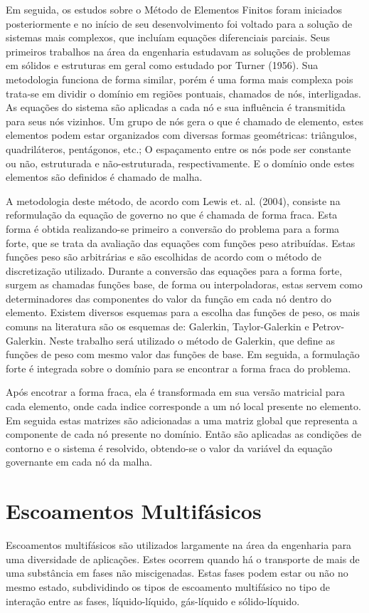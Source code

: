 Em seguida, os estudos sobre o Método de Elementos Finitos foram iniciados posteriormente e no início de seu desenvolvimento foi voltado para a solução de sistemas mais complexos, que incluíam equações diferenciais parciais.
Seus primeiros trabalhos na área da engenharia estudavam as soluções de problemas em sólidos e estruturas em geral como estudado por Turner (1956)\cite{Turner-1956}.
Sua metodologia funciona de forma similar, porém é uma forma mais complexa pois trata-se em dividir o domínio em regiões pontuais, chamados de nós, interligadas.
As equações do sistema são aplicadas a cada nó e sua influência é transmitida para seus nós vizinhos.
Um grupo de nós gera o que é chamado de elemento, estes elementos podem estar organizados com diversas formas geométricas: triângulos, quadriláteros, pentágonos, etc.;
O espaçamento entre os nós pode ser constante ou não, estruturada e não-estruturada, respectivamente.
E o domínio onde estes elementos são definidos é chamado de malha.

A metodologia deste método, de acordo com Lewis et. al. (2004)\cite{lewis}, consiste na reformulação da equação de governo no que é chamada de forma fraca.
Esta forma é obtida realizando-se primeiro a conversão do problema para a forma forte, que se trata da avaliação das equações com funções peso atribuídas.
Estas funções peso são arbitrárias e são escolhidas de acordo com o método de discretização utilizado.
Durante a conversão das equações para a forma forte, surgem as chamadas funções base, de forma ou interpoladoras, estas servem como determinadores das componentes do valor da função em cada nó dentro do elemento.
Existem diversos esquemas para a escolha das funções de peso, os mais comuns na literatura são os esquemas de: Galerkin, Taylor-Galerkin e Petrov-Galerkin.
Neste trabalho será utilizado o método de Galerkin, que define as funções de peso com mesmo valor das funções de base.
Em seguida, a formulação forte é integrada sobre o domínio para se encontrar a forma fraca do problema.

Após encotrar a forma fraca, ela é transformada em sua versão matricial para cada elemento, onde cada indice corresponde a um nó local presente no elemento.
Em seguida estas matrizes são adicionadas a uma matriz global que representa a componente de cada nó presente no domínio.
Então são aplicadas as condições de contorno e o sistema é resolvido, obtendo-se o valor da variável da equação governante em cada nó da malha.


\section{\textbf{Escoamentos Multifásicos}}
\label{sec_rev_MF}
Escoamentos multifásicos são utilizados largamente na área da engenharia para uma diversidade de aplicações.
Estes ocorrem quando há o transporte de mais de uma substância em fases não miscigenadas.
Estas fases podem estar ou não no mesmo estado, subdividindo os tipos de escoamento multifásico no tipo de interação entre as fases, líquido-líquido, gás-líquido e sólido-líquido.

